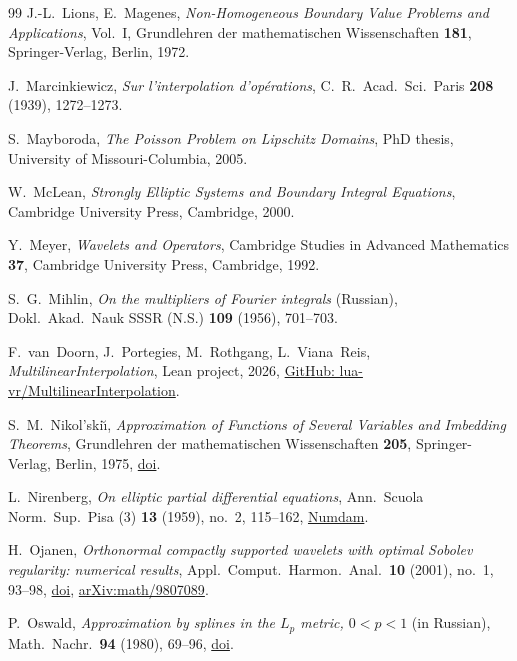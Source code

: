 \begin{thebibliography}{99}
J.-L.~Lions, E.~Magenes,
\emph{Non-Homogeneous Boundary Value Problems and Applications}, Vol.~I,
Grundlehren der mathematischen Wissenschaften \textbf{181}, Springer-Verlag, Berlin, 1972.

J.~Marcinkiewicz,
\emph{Sur l'interpolation d'op\'erations},
C.~R.\ Acad.\ Sci.\ Paris \textbf{208} (1939), 1272--1273.

S.~Mayboroda,
\emph{The Poisson Problem on Lipschitz Domains},
PhD thesis, University of Missouri-Columbia, 2005.

W.~McLean,
\emph{Strongly Elliptic Systems and Boundary Integral Equations},
Cambridge University Press, Cambridge, 2000.

Y.~Meyer,
\emph{Wavelets and Operators},
Cambridge Studies in Advanced Mathematics \textbf{37}, Cambridge University Press, Cambridge,
1992.

S.~G.~Mihlin,
\emph{On the multipliers of Fourier integrals} (Russian),
Dokl.\ Akad.\ Nauk SSSR (N.S.) \textbf{109} (1956), 701--703.

F.~van~Doorn, J.~Portegies, M.~Rothgang, L.~Viana~Reis,
\emph{MultilinearInterpolation}, Lean project, 2026,
\href{https://github.com/lua-vr/MultilinearInterpolation}{GitHub: lua-vr/MultilinearInterpolation}.

S.~M.~Nikol'ski\u{\i},
\emph{Approximation of Functions of Several Variables and Imbedding Theorems},
Grundlehren der mathematischen Wissenschaften \textbf{205}, Springer-Verlag, Berlin, 1975,
\href{https://doi.org/10.1007/978-3-642-65711-5}{doi}.

L.~Nirenberg,
\emph{On elliptic partial differential equations},
Ann.\ Scuola Norm.\ Sup.\ Pisa (3) \textbf{13} (1959), no.~2, 115--162,
\href{https://www.numdam.org/item/ASNSP_1959_3_13_2_115_0}{Numdam}.

H.~Ojanen,
\emph{Orthonormal compactly supported wavelets with optimal Sobolev regularity: numerical
results},
Appl.\ Comput.\ Harmon.\ Anal.\ \textbf{10} (2001), no.~1, 93--98,
\href{https://doi.org/10.1006/acha.2000.0329}{doi},
\href{https://arxiv.org/abs/math/9807089}{arXiv:math/9807089}.

P.~Oswald,
\emph{Approximation by splines in the $L_p$ metric, $0 < p < 1$} (in Russian),
Math.\ Nachr.\ \textbf{94} (1980), 69--96,
\href{https://doi.org/10.1002/mana.19800940107}{doi}.


\end{thebibliography}
